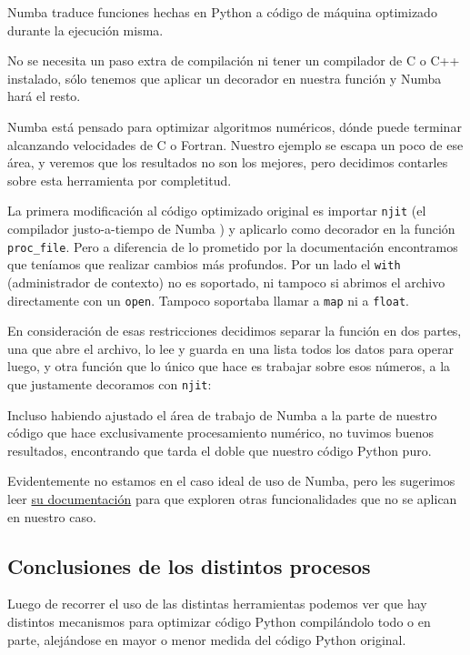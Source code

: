 Numba traduce funciones hechas en Python a código de máquina optimizado durante la ejecución misma. 

No se necesita un paso extra de compilación ni tener un compilador de C o C++ instalado, sólo tenemos que aplicar un decorador en nuestra función y Numba hará el resto.

Numba está pensado para optimizar algoritmos numéricos, dónde puede terminar alcanzando velocidades de C o Fortran. Nuestro ejemplo se escapa un poco de ese área, y veremos que los resultados no son los mejores, pero decidimos contarles sobre esta herramienta por completitud.

La primera modificación al código optimizado original es importar \texttt{njit} (el compilador justo-a-tiempo de Numba ) y aplicarlo como decorador en la función \texttt{proc\_file}. Pero a diferencia de lo prometido por la documentación encontramos que teníamos que realizar cambios más profundos. Por un lado el \texttt{with} (administrador de contexto) no es soportado, ni tampoco si abrimos el archivo directamente con un \texttt{open}. Tampoco soportaba llamar a \texttt{map} ni a \texttt{float}. 

En consideración de esas restricciones decidimos separar la función en dos partes, una que abre el archivo, lo lee y guarda en una lista todos los datos para operar luego, y otra función que lo único que hace es trabajar sobre esos números, a la que justamente decoramos con \texttt{njit}:


Incluso habiendo ajustado el área de trabajo de Numba a la parte de nuestro código que hace exclusivamente procesamiento numérico, no tuvimos buenos resultados, encontrando que tarda el doble que nuestro código Python puro.

Evidentemente no estamos en el caso ideal de uso de Numba, pero les sugerimos leer \href{https://numba.pydata.org/}{su documentación} para que exploren otras funcionalidades que no se aplican en nuestro caso.


\subsection{Conclusiones de los distintos procesos}

Luego de recorrer el uso de las distintas herramientas podemos ver que hay distintos mecanismos para optimizar código Python compilándolo todo o en parte, alejándose en mayor o menor medida del código Python original.

